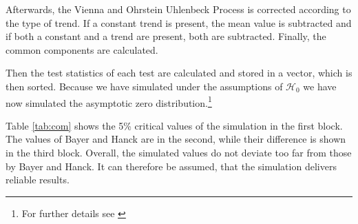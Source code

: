 \documentclass[12pt,a4paper]{article}
\let\rmarkdownfootnote\footnote%
\def\footnote{\protect\rmarkdownfootnote}
\begin{document}
Afterwards, the Vienna and Ohrstein Uhlenbeck Process is corrected
according to the type of trend. If a constant trend is present, the mean
value is subtracted and if both a constant and a trend are present, both
are subtracted. Finally, the common components are calculated.

Then the test statistics of each test are calculated and stored in a
vector, which is then sorted. Because we have simulated under the
assumptions of \(\mathcal{H}_0\) we have now simulated the asymptotic
zero distribution.\footnote{For further details see
  \textcite{pesavento2004}}

Table \ref{tab:com} shows the 5\% critical values of the simulation in
the first block. The values of Bayer and Hanck are in the second, while
their difference is shown in the third block. Overall, the simulated
values do not deviate too far from those by Bayer and Hanck. It can
therefore be assumed, that the simulation delivers reliable results.
\end{document}
